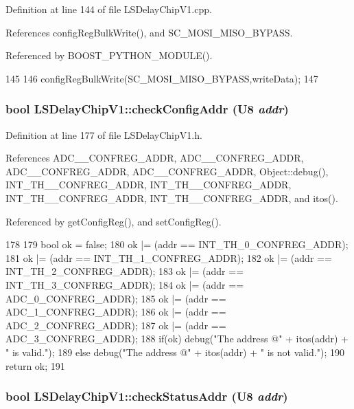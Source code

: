Definition at line 144 of file LSDelayChipV1.cpp.

References configRegBulkWrite(), and SC\_\-MOSI\_\-MISO\_\-BYPASS.

Referenced by BOOST\_\-PYTHON\_\-MODULE().


\begin{DoxyCode}
145 {
146     configRegBulkWrite(SC_MOSI_MISO_BYPASS,writeData);
147 }
\end{DoxyCode}
\hypertarget{classLSDelayChipV1_aa8118972150a9e1e95e9006e003c0206}{
\subsubsection[{checkConfigAddr}]{\setlength{\rightskip}{0pt plus 5cm}bool LSDelayChipV1::checkConfigAddr ({\bf U8} {\em addr})}}
\label{classLSDelayChipV1_aa8118972150a9e1e95e9006e003c0206}


Definition at line 177 of file LSDelayChipV1.h.

References ADC\_\_\-CONFREG\_\-ADDR, ADC\_\_\-CONFREG\_\-ADDR, ADC\_\_\-CONFREG\_\-ADDR, ADC\_\_\-CONFREG\_\-ADDR, Object::debug(), INT\_\-TH\_\_\-CONFREG\_\-ADDR, INT\_\-TH\_\_\-CONFREG\_\-ADDR, INT\_\-TH\_\_\-CONFREG\_\-ADDR, INT\_\-TH\_\_\-CONFREG\_\-ADDR, and itos().

Referenced by getConfigReg(), and setConfigReg().


\begin{DoxyCode}
178     {
179          bool ok = false;
180          ok |= (addr == INT_TH_0_CONFREG_ADDR); 
181          ok |= (addr == INT_TH_1_CONFREG_ADDR);
182          ok |= (addr == INT_TH_2_CONFREG_ADDR);
183          ok |= (addr == INT_TH_3_CONFREG_ADDR);     
184          ok |= (addr == ADC_0_CONFREG_ADDR); 
185          ok |= (addr == ADC_1_CONFREG_ADDR);
186          ok |= (addr == ADC_2_CONFREG_ADDR);
187          ok |= (addr == ADC_3_CONFREG_ADDR);
188          if(ok) debug("The address @" + itos(addr) + " is valid.");
189          else   debug("The address @" + itos(addr) + " is not valid.");
190          return ok;           
191     }
\end{DoxyCode}
\hypertarget{classLSDelayChipV1_a5083f29a93d38258d9de00dd5a89af99}{
\subsubsection[{checkStatusAddr}]{\setlength{\rightskip}{0pt plus 5cm}bool LSDelayChipV1::checkStatusAddr ({\bf U8} {\em addr})}}
\label{classLSDelayChipV1_a5083f29a93d38258d9de00dd5a89af99}


